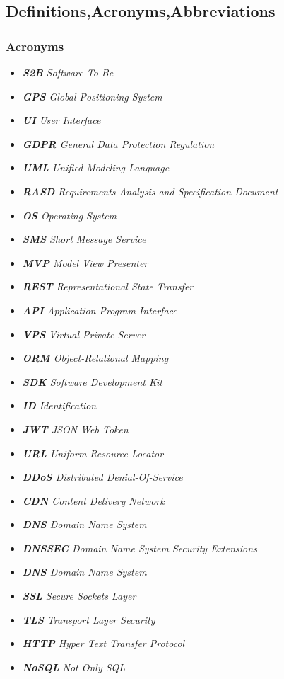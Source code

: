 \subsection{Definitions,Acronyms,Abbreviations}

\subsubsection{Acronyms}
\begin{itemize}
\item[] \emph{\textbf{S2B} Software To Be}
\item[] \emph{\textbf{GPS} Global Positioning System}
\item[] \emph{\textbf{UI} User Interface}
\item[] \emph{\textbf{GDPR} General Data Protection Regulation}
\item[] \emph{\textbf{UML} Unified Modeling Language}
\item[] \emph{\textbf{RASD} Requirements Analysis and Specification Document}
\item[] \emph{\textbf{OS} Operating System}
\item[] \emph{\textbf{SMS} Short Message Service}
\item[] \emph{\textbf{MVP} Model View Presenter}
\item[] \emph{\textbf{REST} Representational State Transfer}
\item[] \emph{\textbf{API} Application Program Interface}
\item[] \emph{\textbf{VPS} Virtual Private Server}
\item[] \emph{\textbf{ORM} Object-Relational Mapping}
\item[] \emph{\textbf{SDK} Software Development Kit}
\item[] \emph{\textbf{ID} Identification}
\item[] \emph{\textbf{JWT} JSON Web Token}
\item[] \emph{\textbf{URL} Uniform Resource Locator}
\item[] \emph{\textbf{DDoS} Distributed Denial-Of-Service}
\item[] \emph{\textbf{CDN} Content Delivery Network}
\item[] \emph{\textbf{DNS} Domain Name System}
\item[] \emph{\textbf{DNSSEC} Domain Name System Security Extensions}
\item[] \emph{\textbf{DNS} Domain Name System}
\item[] \emph{\textbf{SSL} Secure Sockets Layer}
\item[] \emph{\textbf{TLS} Transport Layer Security}
\item[] \emph{\textbf{HTTP} Hyper Text Transfer Protocol}
\item[] \emph{\textbf{NoSQL} Not Only SQL}











\end{itemize}

